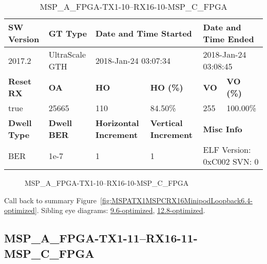 \begin{table}[h]
\centering
\caption{MSP\_A\_FPGA-TX1-10--RX16-10-MSP\_C\_FPGA}
\label{tab:MSPAFPGATX110RX1610MSPCFPGA6.4-optimized}
\begin{tabular}{@{}|l|l|l|l|l|l|@{}}
\toprule
\textbf{SW Version}                & \textbf{GT Type}   & \multicolumn{2}{l|}{\textbf{Date and Time Started}}            & \multicolumn{2}{l|}{\textbf{Date and Time Ended}}        \\ \midrule
2017.2                       & UltraScale GTH          & \multicolumn{2}{l|}{2018-Jan-24 03:07:34}                   & \multicolumn{2}{l|}{2018-Jan-24 03:08:45}               \\ \midrule
\textbf{Reset RX}                  & \textbf{OA} & \textbf{HO}   & \textbf{HO (\%)} & \textbf{VO} & \textbf{VO (\%)} \\ \midrule
true & 25665        & 110          & 84.50\%        & 255        & 100.00\%       \\ \midrule
\textbf{Dwell Type}                & \textbf{Dwell BER} & \textbf{Horizontal Increment} & \textbf{Vertical Increment}    & \multicolumn{2}{l|}{\textbf{Misc Info}}                  \\ \midrule
BER                            & 1e-7        & 1        & 1           & \multicolumn{2}{l|}{ELF Version: 0xC002 SVN: 0}                         \\ \bottomrule
\end{tabular}
\end{table}

\begin{figure}[h]
\caption{MSP\_A\_FPGA-TX1-10--RX16-10-MSP\_C\_FPGA} \label{fig:MSPAFPGATX110RX1610MSPCFPGA6.4-optimized}
\end{figure}

Call back to summary Figure~\ref{fig:MSPATX1MSPCRX16MinipodLoopback6.4-optimized}.
Sibling eye diagrams: \hyperref[sec:MSPAFPGATX110RX1610MSPCFPGA9.6-optimized]{9.6-optimized}, \hyperref[sec:MSPAFPGATX110RX1610MSPCFPGA12.8-optimized]{12.8-optimized}.

\clearpage
\newpage


\subsection{MSP\_A\_FPGA-TX1-11--RX16-11-MSP\_C\_FPGA}\label{sec:MSPAFPGATX111RX1611MSPCFPGA6.4-optimized}

